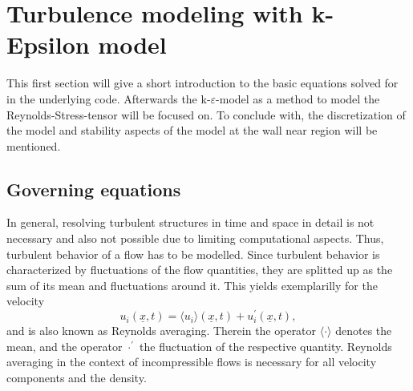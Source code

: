 

\chapter{Turbulence modeling with k-Epsilon model} %
\label{cha:turbulence_modeling_with_k_epsilon_model}

This first section will give a short introduction to the basic equations solved for in the underlying code. Afterwards
the k-$\varepsilon$-model as a method to model the Reynolds-Stress-tensor will be focused on. To conclude with, the discretization of the model and
stability aspects of the model at the wall near region will be mentioned.  

\section{Governing equations} %
\label{sec:governing_equations}

In general, resolving turbulent structures in time and space in detail is not necessary and also not possible due to limiting computational aspects.
Thus, turbulent behavior of a flow has to be modelled.
Since turbulent behavior is characterized by fluctuations of the flow quantities, they are splitted up as the sum of its mean and fluctuations around it. This yields exemplarilly for the velocity
\begin{equation}
	u_i(\underline{x},t) = \langle u_i \rangle (\underline{x},t) + u^{\prime}_i(\underline{x},t),
\end{equation}
and is also known as Reynolds averaging. Therein the operator $\langle \cdot \rangle$ denotes the mean, and the operator $\cdot^{\prime}$ the fluctuation of the respective quantity. Reynolds averaging in the context of incompressible flows is necessary for all velocity components and the
density.

